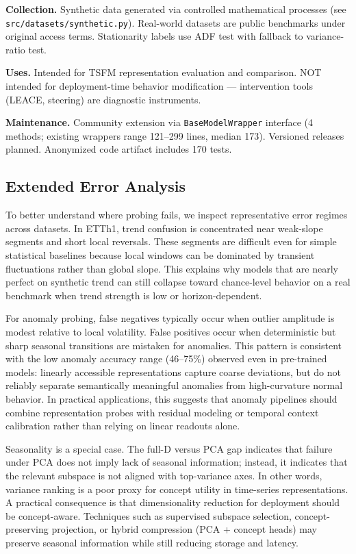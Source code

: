\documentclass{article}
\begin{document}
\textbf{Collection.} Synthetic data generated via controlled mathematical processes (see \texttt{src/datasets/synthetic.py}). Real-world datasets are public benchmarks under original access terms. Stationarity labels use ADF test \cite{Dickey1979} with fallback to variance-ratio test.

\textbf{Uses.} Intended for TSFM representation evaluation and comparison. NOT intended for deployment-time behavior modification --- intervention tools (LEACE, steering) are diagnostic instruments.

\textbf{Maintenance.} Community extension via \texttt{BaseModelWrapper} interface (4 methods; existing wrappers range 121--299 lines, median 173). Versioned releases planned. Anonymized code artifact includes 170 tests.

\subsection{Extended Error Analysis}
\label{sec:error_analysis}

To better understand where probing fails, we inspect representative error regimes across datasets.
In ETTh1, trend confusion is concentrated near weak-slope segments and short local reversals. These
segments are difficult even for simple statistical baselines because local windows can be dominated
by transient fluctuations rather than global slope. This explains why models that are nearly perfect
on synthetic trend can still collapse toward chance-level behavior on a real benchmark when trend
strength is low or horizon-dependent.

For anomaly probing, false negatives typically occur when outlier amplitude is modest relative to
local volatility. False positives occur when deterministic but sharp seasonal transitions are
mistaken for anomalies. This pattern is consistent with the low anomaly accuracy range (46--75\%)
observed even in pre-trained models: linearly accessible representations capture coarse deviations,
but do not reliably separate semantically meaningful anomalies from high-curvature normal behavior.
In practical applications, this suggests that anomaly pipelines should combine representation probes
with residual modeling or temporal context calibration rather than relying on linear readouts alone.

Seasonality is a special case. The full-D versus PCA gap indicates that failure under PCA does not
imply lack of seasonal information; instead, it indicates that the relevant subspace is not aligned
with top-variance axes. In other words, variance ranking is a poor proxy for concept utility in
time-series representations. A practical consequence is that dimensionality reduction for deployment
should be concept-aware. Techniques such as supervised subspace selection, concept-preserving
projection, or hybrid compression (PCA + concept heads) may preserve seasonal information while
still reducing storage and latency.
\end{document}
